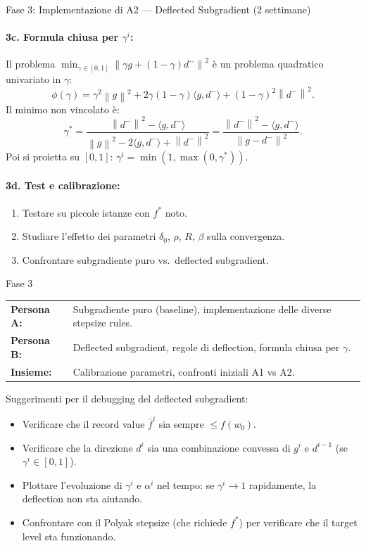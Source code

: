 \documentclass[a4paper,11pt]{article}
\newcommand{\norm}[1]{\left\lVert #1 \right\rVert}
\begin{document}
\begin{phasebox}{Fase 3: Implementazione di A2 --- Deflected Subgradient (2 settimane)}
\paragraph{3c. Formula chiusa per $\gamma^i$:}
Il problema $\min_{\gamma \in [0,1]} \norm{\gamma g + (1-\gamma) d^{-}}^2$ è un problema quadratico univariato in $\gamma$:
\[
  \phi(\gamma) = \gamma^2\norm{g}^2 + 2\gamma(1-\gamma)\langle g, d^{-}\rangle + (1-\gamma)^2\norm{d^{-}}^2.
\]
Il minimo non vincolato è:
\[
  \gamma^* = \frac{\norm{d^{-}}^2 - \langle g, d^{-}\rangle}{\norm{g}^2 - 2\langle g, d^{-}\rangle + \norm{d^{-}}^2} = \frac{\norm{d^{-}}^2 - \langle g, d^{-}\rangle}{\norm{g - d^{-}}^2}.
\]
Poi si proietta su $[0, 1]$: $\gamma^i = \min(1, \max(0, \gamma^*))$.

\paragraph{3d. Test e calibrazione:}
\begin{enumerate}[nosep]
  \item Testare su piccole istanze con $f^*$ noto.
  \item Studiare l'effetto dei parametri $\delta_0$, $\rho$, $R$, $\beta$ sulla convergenza.
  \item Confrontare subgradiente puro vs.\ deflected subgradient.
\end{enumerate}

\begin{splitbox}{Fase 3}
\begin{tabularx}{\textwidth}{lX}
\textbf{Persona A:} & Subgradiente puro (baseline), implementazione delle diverse stepsize rules. \\
\textbf{Persona B:} & Deflected subgradient, regole di deflection, formula chiusa per $\gamma$. \\
\textbf{Insieme:} & Calibrazione parametri, confronti iniziali A1 vs A2.
\end{tabularx}
\end{splitbox}

\begin{tipbox}
Suggerimenti per il debugging del deflected subgradient:
\begin{itemize}[nosep]
  \item Verificare che il record value $\bar{f}^i$ sia sempre $\leq f(w_0)$.
  \item Verificare che la direzione $d^i$ sia una combinazione convessa di $g^i$ e $d^{i-1}$ (se $\gamma^i \in [0,1]$).
  \item Plottare l'evoluzione di $\gamma^i$ e $\alpha^i$ nel tempo: se $\gamma^i \to 1$ rapidamente, la deflection non sta aiutando.
  \item Confrontare con il Polyak stepsize (che richiede $f^*$) per verificare che il target level sta funzionando.
\end{itemize}
\end{tipbox}
\end{phasebox}
\end{document}
